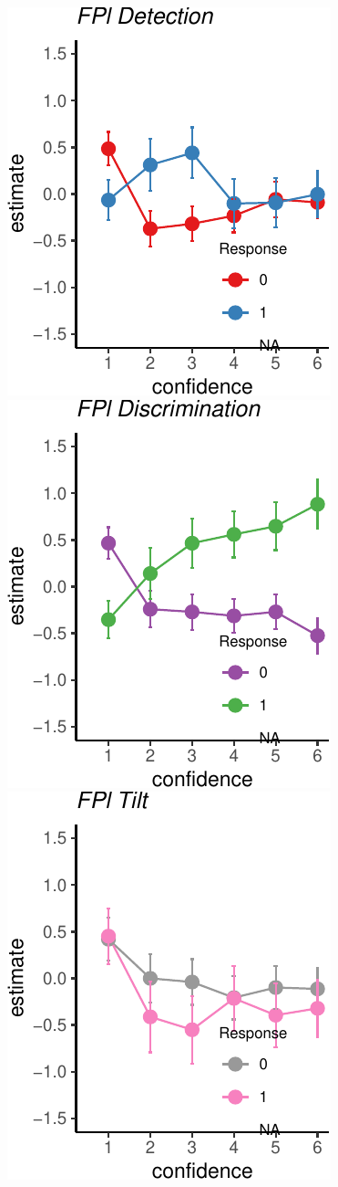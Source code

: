 \documentclass[]{article}
\begin{document}
\includegraphics{Chudi-Thesis_files/figure-latex/mixed_effects-10.pdf}
\includegraphics{Chudi-Thesis_files/figure-latex/mixed_effects-11.pdf}
\includegraphics{Chudi-Thesis_files/figure-latex/mixed_effects-12.pdf}
\end{document}
